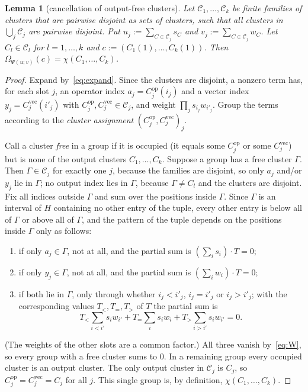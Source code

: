 \documentclass[11pt]{amsart}
\newtheorem{lemma}[theorem]{Lemma}
\theoremstyle{definition}
\theoremstyle{remark}
\numberwithin{equation}{section}
\newcommand{\cC}{\mathcal{C}}
\newcommand{\Cop}{C^{\mathrm{op}}}
\newcommand{\Cvec}{C^{\mathrm{vec}}}
\begin{document}
\begin{lemma}[cancellation of output-free clusters]\label{lem:C}
Let $\cC_1,\dots,\cC_k$ be finite families of clusters that are pairwise disjoint as sets of clusters, such that all
clusters in $\bigcup_j\cC_j$ are pairwise disjoint. Put $u_j:=\sum_{C\in\cC_j}s_C$ and $v_j:=\sum_{C\in\cC_j}w_C$. Let
$C_l\in\cC_l$ for $l=1,\dots,k$ and $c:=(C_1(1),\dots,C_k(1))$. Then $\Omega_{\Psi(u;v)}(c)=\chi(C_1,\dots,C_k)$.
\end{lemma}

\begin{proof}
Expand by~\eqref{eq:expand}. Since the clusters are disjoint, a nonzero term has, for each slot $j$, an operator index
$a_j=\Cop_j(i_j)$ and a vector index $y_j=\Cvec_j(i'_j)$ with $\Cop_j,\Cvec_j\in\cC_j$, and weight
$\prod_js_{i_j}w_{i'_j}$. Group the terms according to the \emph{cluster assignment} $(\Cop_j,\Cvec_j)_{j}$.

Call a cluster \emph{free} in a group if it is occupied (it equals some $\Cop_j$ or some $\Cvec_j$) but is none of the output
clusters $C_1,\dots,C_k$. Suppose a group has a free cluster $\Gamma$. Then $\Gamma\in\cC_j$ for exactly one $j$, because
the families are disjoint, so only $a_j$ and/or $y_j$ lie in $\Gamma$; no output index lies in $\Gamma$, because $\Gamma\ne
C_l$ and the clusters are disjoint. Fix all indices outside $\Gamma$ and sum over the positions inside $\Gamma$. Since
$\Gamma$ is an interval of $H$ containing no other entry of the tuple, every other entry is below all of $\Gamma$ or above
all of $\Gamma$, and the pattern of the tuple depends on the positions inside $\Gamma$ only as follows:
\begin{enumerate}
\item[(i)] if only $a_j\in\Gamma$, not at all, and the partial sum is $(\sum_is_i)\cdot T=0$;
\item[(ii)] if only $y_j\in\Gamma$, not at all, and the partial sum is $(\sum_iw_i)\cdot T=0$;
\item[(iii)] if both lie in $\Gamma$, only through whether $i_j<i'_j$, $i_j=i'_j$ or $i_j>i'_j$; with the corresponding
values $T_<,T_=,T_>$ of $T$ the partial sum is
\[
T_<\sum_{i<i'}s_iw_{i'}+T_=\sum_is_iw_i+T_>\sum_{i>i'}s_iw_{i'}=0 .
\]
\end{enumerate}
(The weights of the other slots are a common factor.) All three vanish by~\eqref{eq:W}, so every group with a free
cluster sums to $0$. In a remaining group every occupied cluster is an output cluster. The only output cluster in
$\cC_j$ is $C_j$, so $\Cop_j=\Cvec_j=C_j$ for all $j$. This single group is, by definition, $\chi(C_1,\dots,C_k)$.
\end{proof}
\end{document}
